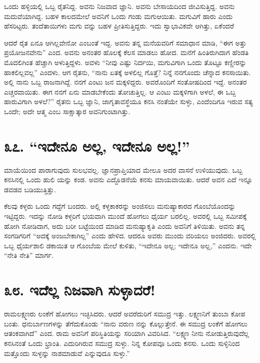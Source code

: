 ಒಂದು ಹಳ್ಳಿಯಲ್ಲಿ ಒಬ್ಬ ರೈತನಿದ್ದ. ಅವನು ನಿಜವಾದ ಜ್ಞಾನಿ. ಅವನು ಬೇಸಾಯದಿಂದ ಜೀವಿಸುತ್ತಿದ್ದ. ಅವನು ಮದುವೆಯಾಗಿದ್ದ. ಬಹಳ ಕಾಲದಮೇಲೆ ಅವನಿಗೆ ಒಂದು ಗಂಡು ಮಗುಆಯಿತು. ಮಗುವಿಗೆ ಹಾರು ಎಂದು ಹೆಸರಿಟ್ಟರು. ತಂದೆತಾಯಿಗಳು ಮಗು ವನ್ನು ಬಹಳ ಪ್ರೀತಿಸುತ್ತಿದ್ದರು. ಇದು ಸ್ವಾಭಾವಿಕವೇ ಆಗಿತ್ತು, ಏಕೆಂದರೆ

ಆದರೆ ರೈತ ಏನೂ ಆಗಿಲ್ಲವೇನೋ ಎಂಬಂತೆ ಇದ್ದ. ಅವನು ತನ್ನ ಮನೆಯವರಿಗೆ ಸಮಾಧಾನ ಮಾಡಿ, “ಈಗ ಅತ್ತು ಪ್ರಯೋಜನವೇನು” ಎಂದ. ಅವನು ಅನಂತರ ಹೊಲಕ್ಕೆ ಕೆಲಸ ಮಾಡಲು ಹೋದ. ಮನೆಗೆ ಹಿಂತಿರುಗಿದಾಗ ಹೆಂಡತಿ ಮೊದಲಿಗಿಂತ ಹೆಚ್ಚಾಗಿ ಅಳುತ್ತಿದ್ದಳು. ಅವಳು “ನೀವು ಎಷ್ಟು ನಿರ್ದಯಿ, ಮಗುವಿಗಾಗಿ ಒಂದು ತೊಟ್ಟೂ ಕಣ್ಣೀರನ್ನು ಹಾಕಲಿಲ್ಲವಲ್ಲ” ಎಂದಳು. ಆಗ ರೈತನು, “ನಾನು ಏತಕ್ಕೆ ಅಳಲಿಲ್ಲ ಗೊತ್ತೆ? ನಿನ್ನೆ ನನಗೊಂದು ಚೆನ್ನಾದ ಕನಸಾಯಿತು. ಅಲ್ಲಿ ನಾನು ಒಬ್ಬ ರಾಜನಾಗಿದ್ದೆ. ನನಗೆ ಎಂಟು ಜನ ಮಕ್ಕಳಿದ್ದರು. ಅವರೊಂದಿಗೆ ಸಂತೋಷದಿಂದ ಇದ್ದೆ. ಅನಂತರ ಎಚ್ಚರವಾಯಿತು. ಈಗ ನನಗೆ ಏನು ಮಾಡಬೇಕೆಂದು ತೋಚುತ್ತಿಲ್ಲ. ಆ ಎಂಟು ಮಕ್ಕಳಿಗಾಗಿ ಅಳಲೆ, ಈ ಒಬ್ಬ ಹಾರುವಿಗಾಗಿ ಅಳಲೆ?” ರೈತನು ಒಬ್ಬ ಜ್ಞಾನಿ, ಜಾಗೃತಾವಸ್ಥೆಯೂ ಕನಸಿ ನಂತೆಯೇ ಸುಳ್ಳು, ಎಂದೆಂದಿಗೂ ಇರುವ ಸತ್ಯ ಒಂದೇ; ಅದೇ ಆತ್ಮ ಎಂಬ ಸಾಕ್ಷಾತ್ಕಾರ ಅವನಿಗುಂಟಾಗಿತ್ತು.


\section{\num{೩೭. } “ಇದೇನೂ ಅಲ್ಲ, ಇದೇನೂ ಅಲ್ಲ!”}

ಮಾಯೆಯಿಂದ ಪಾರಾಗುವುದು ಸುಲಭವಲ್ಲ. ಜ್ಞಾನಪ್ರಾಪ್ತಿಯಾದ ಮೇಲೂ ಅದರ ವಾಸನೆ ಉಳಿಯುವುದು. ಒಬ್ಬ ಕನಸಿನಲ್ಲಿ ಒಂದು ಹುಲಿ ಯನ್ನು ಕಂಡ. ಅವನು ಎದ್ದೊಡನೆಯೆ ಕನಸು ಮಾಯವಾಯಿತು. ಆದರೆ ಅವನ ಎದೆ ಇನ್ನೂ ಡವಡವ ಬಡಿಯುತ್ತಿತ್ತು.

ಕೆಲವು ಕಳ್ಳರು ಒಂದು ಗದ್ದೆಗೆ ಬಂದರು. ಅಲ್ಲಿ ಕಳ್ಳಕಾಕರನ್ನು ಅಂಜಿಸಲು ಮನುಷ್ಯಾಕಾರದ ಗೊಂಬೆಯೊಂದನ್ನು ಇಟ್ಟಿದ್ದರು. ಇದನ್ನು ನೋಡಿ ಕಳ್ಳರಿಗೆ ಭಯವಾಗಿ ಮುಂದೆ ಹೋಗಲು ಧೈರ್ಯ ಬರಲಿಲ್ಲ. ಅವರಲ್ಲಿ ಒಬ್ಬ ಸಮೀಪಕ್ಕೆ ಹೋಗಿ ನೋಡಿದಾಗ, ಅದು ಬರೀ ಬಟ್ಟೆಯಿಂದ ಮಾಡಿದ ಮನುಷ್ಯಾಕೃತಿ ಎಂದು ಅವನಿಗೆ ತಿಳಿಯಿತು. ಅವನು ತನ್ನ ಸಂಗಡಿಗರಿಗೆ “ಅದಕ್ಕೆ ಅಂಜಬೇಕಾಗಿಲ್ಲ” ಎಂದು ಹೇಳಿದ. ಆದರೂ ಅವರು ಮುಂದು ವರಿಯಲು ಅಂಜಿದರು. ಅವರಲ್ಲಿ ಒಬ್ಬ ಧೈರ್ಯಶಾಲಿ ಡಕಾಯಿತ ಆ ಗೊಂಬೆಯ ಮೇಲೆ ಕುಳಿತು, “ಇದೇನೂ ಅಲ್ಲ; ಇದೇನೂ ಅಲ್ಲ,” ಎಂದನು. ಇದೇ “ನೇತಿ ನೇತಿ” ಮಾರ್ಗ.


\section{\num{೩೮. } ಇದೆಲ್ಲ ನಿಜವಾಗಿ ಸುಳ್ಳಾದರೆ!}

ರಾಮಲಕ್ಷ್ಮಣರು ಲಂಕೆಗೆ ಹೋಗಲು ಇಚ್ಛಿಸಿದರು. ಆದರೆ ಅವರೆದುರಿಗೆ ಸಮುದ್ರ ಇತ್ತು. ಲಕ್ಷ್ಮಣನಿಗೆ ತುಂಬಾ ಕೋಪ ಬಂತು. ಧನುರ್ಬಾಣಗಳನ್ನು ತೆಗೆದುಕೊಂಡು “ನಾನು ವರುಣ ನನ್ನು ಕೊಲ್ಲುತ್ತೇನೆ. ಈ ಸಮುದ್ರ ಲಂಕೆಗೆ ಹೋಗಲು ಆತಂಕವಾಗಿದೆ” ಎಂದ. ರಾಮ ಅವನಿಗೆ ಪರಿಸ್ಥಿತಿಯನ್ನು ಸರಿಯಾಗಿ ವಿವರಿಸಿದ. “ಲಕ್ಷ್ಮಣ ನೀನು ನೋಡುತ್ತಿರುವುದೆಲ್ಲ ಕನಸಿನಂತೆ ಒಂದು ಭ್ರಾಂತಿ. ಎದುರಿಗಿರುವ ಸಮುದ್ರ ಸುಳ್ಳು. ನಿನ್ನ ಕೋಪವೂ ಒಂದು ಕನಸು. ಒಂದು ಸುಳ್ಳಿನಿಂದ ಮತ್ತೊಂದು ಸುಳ್ಳನ್ನು ನಾಶಮಾಡುವೆ ಎನ್ನುವುದೂ ಸುಳ್ಳು.”

